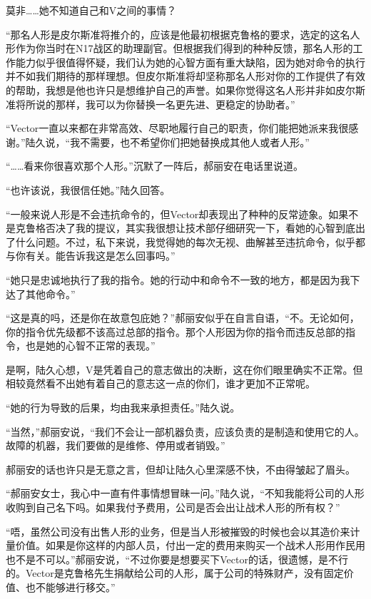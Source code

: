 莫非……她不知道自己和V之间的事情？

“那名人形是皮尔斯准将推介的，应该是他最初根据克鲁格的要求，选定的这名人形作为你当时在N17战区的助理副官。但根据我们得到的种种反馈，那名人形的工作能力似乎很值得怀疑，我们认为她的心智方面有重大缺陷，因为她对命令的执行并不如我们期待的那样理想。但皮尔斯准将却坚称那名人形对你的工作提供了有效的帮助，我想是他也许只是想维护自己的声誉。如果你觉得这名人形并非如皮尔斯准将所说的那样，我可以为你替换一名更先进、更稳定的协助者。”

“Vector一直以来都在非常高效、尽职地履行自己的职责，你们能把她派来我很感谢。”陆久说，“我不需要，也不希望你们把她替换成其他人或者人形。”

“……看来你很喜欢那个人形。”沉默了一阵后，郝丽安在电话里说道。

“也许该说，我很信任她。”陆久回答。

“一般来说人形是不会违抗命令的，但Vector却表现出了种种的反常迹象。如果不是克鲁格否决了我的提议，其实我很想让技术部仔细研究一下，看她的心智到底出了什么问题。不过，私下来说，我觉得她的每次无视、曲解甚至违抗命令，似乎都与你有关。能告诉我这是怎么回事吗。”

“她只是忠诚地执行了我的指令。她的行动中和命令不一致的地方，都是因为我下达了其他命令。”

“这是真的吗，还是你在故意包庇她？”郝丽安似乎在自言自语，“不。无论如何，你的指令优先级都不该高过总部的指令。那个人形因为你的指令而违反总部的指令，也是她的心智不正常的表现。”

是啊，陆久心想，V是凭着自己的意志做出的决断，这在你们眼里确实不正常。但相较竟然看不出她有着自己的意志这一点的你们，谁才更加不正常呢。

“她的行为导致的后果，均由我来承担责任。”陆久说。

“当然，”郝丽安说，“我们不会让一部机器负责，应该负责的是制造和使用它的人。故障的机器，我们要做的是维修、停用或者销毁。”

郝丽安的话也许只是无意之言，但却让陆久心里深感不快，不由得皱起了眉头。

“郝丽安女士，我心中一直有件事情想冒昧一问。”陆久说，“不知我能将公司的人形收购到自己名下吗。如果我付予费用，公司是否会出让战术人形的所有权？”

“唔，虽然公司没有出售人形的业务，但是当人形被摧毁的时候也会以其造价来计量价值。如果是你这样的内部人员，付出一定的费用来购买一个战术人形用作民用也不是不可以。”郝丽安说，“不过你要是想要买下Vector的话，很遗憾，是不行的。Vector是克鲁格先生捐献给公司的人形，属于公司的特殊财产，没有固定价值、也不能够进行移交。”



